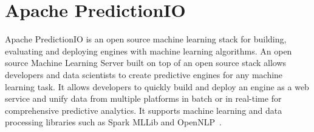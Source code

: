 \section{Apache PredictionIO}

Apache PredictionIO is an open source machine learning stack for building, evaluating and deploying engines with machine learning algorithms. An open source Machine Learning Server built on top of an open source stack allows developers and data scientists to create predictive engines for any machine learning task. It allows developers to quickly build and deploy an engine as a web service and unify data from multiple platforms in batch or in real-time for comprehensive predictive analytics. It supports machine learning and data processing libraries such as Spark MLLib and OpenNLP~\cite{hid-sp18-510-web-PredIO}.

